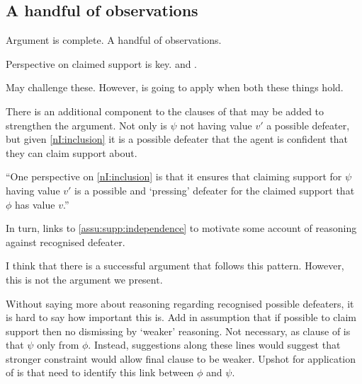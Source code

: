 \newpage

\subsection*{A handful of observations}

\begin{note}
  Argument is complete.
  A handful of observations.
\end{note}

\begin{note}
  Perspective on claimed support is key.
  \nfcs{} and \eiS{}.

  May challenge these.
  However, \nI{} is going to apply when both these things hold.
\end{note}

\begin{note}
  There is an additional component to the clauses of \nI{} that may be added to strengthen the argument.
  Not only is \(\psi\) not having value \(v'\) a possible defeater, but given \ref{nI:inclusion} it is a possible defeater that the agent is confident that they can claim support about.

  ``One perspective on \ref{nI:inclusion} is that it ensures that claiming support for \(\psi\) having value \(v'\) is a possible and `pressing' defeater for the claimed support that \(\phi\) has value \(v\).''

  {
    \color{red}
     In turn, links to \autoref{assu:supp:independence} to motivate some account of reasoning against recognised defeater.

  I think that there is a successful argument that follows this pattern.
  However, this is not the argument we present.
  }

  Without saying more about reasoning regarding recognised possible defeaters, it is hard to say how important this is.
  Add in assumption that if possible to claim support then no dismissing by `weaker' reasoning.
  Not necessary, as clause of \nI{} is that \(\psi\) only from \(\phi\).
  Instead, suggestions along these lines would suggest that \nI{} stronger constraint would allow final clause to be weaker.
  Upshot for application of \nI{} is that need to identify this link between \(\phi\) and \(\psi\).
\end{note}


